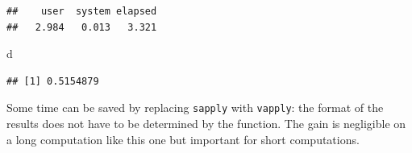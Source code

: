 \documentclass[
  12pt,
  american,
  a4paper,
  extrafontsizes,onecolumn,openright
  ]{memoir}
\newenvironment{Shaded}{\begin{snugshade}}{\end{snugshade}}
\newcommand{\ControlFlowTok}[1]{\textcolor[rgb]{0.13,0.29,0.53}{\textbf{#1}}}
\newcommand{\DecValTok}[1]{\textcolor[rgb]{0.00,0.00,0.81}{#1}}
\newcommand{\FunctionTok}[1]{\textcolor[rgb]{0.13,0.29,0.53}{\textbf{#1}}}
\newcommand{\NormalTok}[1]{#1}
\newcommand{\OtherTok}[1]{\textcolor[rgb]{0.56,0.35,0.01}{#1}}
\newcommand{\SpecialCharTok}[1]{\textcolor[rgb]{0.81,0.36,0.00}{\textbf{#1}}}
\begin{document}
\begin{Shaded}
\end{Shaded}

\begin{verbatim}
##    user  system elapsed 
##   2.984   0.013   3.321
\end{verbatim}

\begin{Shaded}
\begin{Highlighting}[]
\NormalTok{d}
\end{Highlighting}
\end{Shaded}

\begin{verbatim}
## [1] 0.5154879
\end{verbatim}

\normalsize

Some time can be saved by replacing \texttt{sapply} with \texttt{vapply}: the format of the results does not have to be determined by the function.
The gain is negligible on a long computation like this one but important for short computations.

\scriptsize
\end{document}
